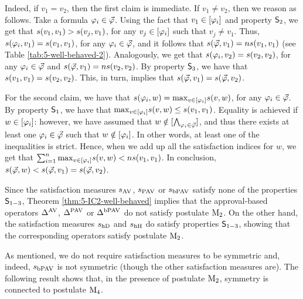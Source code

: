 \begin{prf*}{}{}
	Indeed, if $v_1=v_2$, then the first claim is immediate.
	If $v_1\neq v_2$, then we reason as follows.
	Take a formula $\phi_i\in\P$.
	Using the fact that $v_1\in\mods{\phi_i}$ and property $\SM{2}$,
	we get that $\sat(v_1,v_1)>\sat(v_j,v_1)$, for any $v_j\in\mods{\phi_i}$
	such that $v_j\neq v_1$.
	Thus, $\sat(\phi_i,v_1)=\sat(v_1,v_1)$, for any $\phi_i\in\P$,
	and it follows that $\sat(\P,v_1)=n\sat(v_1,v_1)$
	(see Table \ref{tab:5-well-behaved-2}).
	Analogously, we get that $\sat(\phi_i,v_2)=\sat(v_2,v_2)$, for any $\phi_i\in\P$
	and $\sat(\P,v_1)=n\sat(v_2,v_2)$.
	By property $\SM{3}$, we have that $\sat(v_1,v_1)=\sat(v_2,v_2)$.
	This, in turn, implies that $\sat(\P,v_1)=\sat(\P,v_2)$.
	
	For the second claim, we have that $\sat(\phi_i,w)=\max_{v\in\mods{\phi_i}}\sat(v,w)$,
	for any $\phi_i\in\P$.
	By property $\SM{1}$, we have that $\max_{v\in\mods{\phi_i}}\sat(v,w)\leq\sat(v_1,v_1)$.
	Equality is achieved if $w\in\mods{\phi_i}$:
	however, we have assumed that $w\notin\mods{\bigwedge_{\phi_i\in\P}}$,
	and thus there exists at least one $\phi_i\in\P$ such that $w\notin\mods{\phi_i}$.
	In other words, at least one of the inequalities is strict.
	Hence, when we add up all the satisfaction indices for $w$,
	we get that $\sum_{i=1}^{n}\max_{v\in\mods{\phi_i}}\sat(v,w)<n\sat(v_1,v_1)$.
	In conclusion, $\sat(\P,w)<\sat(\P,v_1)=\sat(\P,v_2)$.
\end{prf*}

Since the satisfaction measures $\sat_\av$, $\sat_\pav$ or $\sat_\bpav$
satisfy none of the properties $\SM{1-3}$, Theorem \ref{thm:5-IC2-well-behaved} 
implies that the approval-based operators $\me^{\av}$, $\me^{\pav}$ or $\me^{\bpav}$ 
do not satisfy postulate $\ppm{2}$.
On the other hand, the satisfaction measures $\sat_\hdrastic$ and 
$\sat_\hhamming$ do satisfy properties $\SM{1-3}$, showing that
the corresponding operators satisfy postulate $\ppm{2}$.

As mentioned, we do not require satisfaction measures to be symmetric
and, indeed, $\sat_\bpav$ is not symmetric (though the other satisfaction measures are).
The following result shows that, in the presence of postulate $\ppm{2}$, symmetry is connected to postulate $\ppm{4}$.

